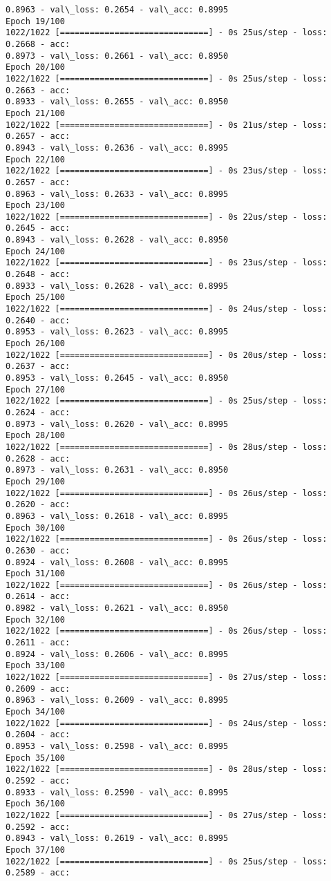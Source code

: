 \documentclass[11pt]{article}
\begin{document}
\begin{Verbatim}[commandchars=\\\{\}]
0.8963 - val\_loss: 0.2654 - val\_acc: 0.8995
Epoch 19/100
1022/1022 [==============================] - 0s 25us/step - loss: 0.2668 - acc:
0.8973 - val\_loss: 0.2661 - val\_acc: 0.8950
Epoch 20/100
1022/1022 [==============================] - 0s 25us/step - loss: 0.2663 - acc:
0.8933 - val\_loss: 0.2655 - val\_acc: 0.8950
Epoch 21/100
1022/1022 [==============================] - 0s 21us/step - loss: 0.2657 - acc:
0.8943 - val\_loss: 0.2636 - val\_acc: 0.8995
Epoch 22/100
1022/1022 [==============================] - 0s 23us/step - loss: 0.2657 - acc:
0.8963 - val\_loss: 0.2633 - val\_acc: 0.8995
Epoch 23/100
1022/1022 [==============================] - 0s 22us/step - loss: 0.2645 - acc:
0.8943 - val\_loss: 0.2628 - val\_acc: 0.8950
Epoch 24/100
1022/1022 [==============================] - 0s 23us/step - loss: 0.2648 - acc:
0.8933 - val\_loss: 0.2628 - val\_acc: 0.8995
Epoch 25/100
1022/1022 [==============================] - 0s 24us/step - loss: 0.2640 - acc:
0.8953 - val\_loss: 0.2623 - val\_acc: 0.8995
Epoch 26/100
1022/1022 [==============================] - 0s 20us/step - loss: 0.2637 - acc:
0.8953 - val\_loss: 0.2645 - val\_acc: 0.8950
Epoch 27/100
1022/1022 [==============================] - 0s 25us/step - loss: 0.2624 - acc:
0.8973 - val\_loss: 0.2620 - val\_acc: 0.8995
Epoch 28/100
1022/1022 [==============================] - 0s 28us/step - loss: 0.2628 - acc:
0.8973 - val\_loss: 0.2631 - val\_acc: 0.8950
Epoch 29/100
1022/1022 [==============================] - 0s 26us/step - loss: 0.2620 - acc:
0.8963 - val\_loss: 0.2618 - val\_acc: 0.8995
Epoch 30/100
1022/1022 [==============================] - 0s 26us/step - loss: 0.2630 - acc:
0.8924 - val\_loss: 0.2608 - val\_acc: 0.8995
Epoch 31/100
1022/1022 [==============================] - 0s 26us/step - loss: 0.2614 - acc:
0.8982 - val\_loss: 0.2621 - val\_acc: 0.8950
Epoch 32/100
1022/1022 [==============================] - 0s 26us/step - loss: 0.2611 - acc:
0.8924 - val\_loss: 0.2606 - val\_acc: 0.8995
Epoch 33/100
1022/1022 [==============================] - 0s 27us/step - loss: 0.2609 - acc:
0.8963 - val\_loss: 0.2609 - val\_acc: 0.8995
Epoch 34/100
1022/1022 [==============================] - 0s 24us/step - loss: 0.2604 - acc:
0.8953 - val\_loss: 0.2598 - val\_acc: 0.8995
Epoch 35/100
1022/1022 [==============================] - 0s 28us/step - loss: 0.2592 - acc:
0.8933 - val\_loss: 0.2590 - val\_acc: 0.8995
Epoch 36/100
1022/1022 [==============================] - 0s 27us/step - loss: 0.2592 - acc:
0.8943 - val\_loss: 0.2619 - val\_acc: 0.8995
Epoch 37/100
1022/1022 [==============================] - 0s 25us/step - loss: 0.2589 - acc:

\end{Verbatim}
\end{document}
